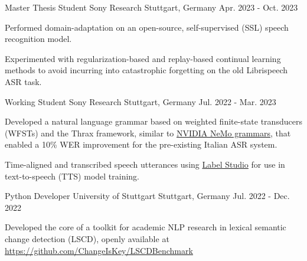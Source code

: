 

\begin{cventries}

  \cventry
    {Master Thesis Student} %
    {Sony Research} %
    {Stuttgart, Germany} %
    {Apr. 2023 - Oct. 2023} %
    {
      \begin{cvitems} %
        \item {Performed domain-adaptation on an open-source, self-supervised (SSL) speech recognition model.}
        \item {Experimented with regularization-based and replay-based continual learning methods to avoid incurring into catastrophic forgetting on the old Librispeech ASR task.}
      \end{cvitems}
    }

  \cventry
    {Working Student} %
    {Sony Research} %
    {Stuttgart, Germany} %
    {Jul. 2022 - Mar. 2023} %
    {
      \begin{cvitems} %
        \item {Developed a natural language grammar based on weighted finite-state transducers (WFSTs) and the Thrax framework, similar to \href{https://github.com/NVIDIA/NeMo-text-processing}{NVIDIA NeMo grammars}, that enabled a 10\% WER improvement for the pre-existing Italian ASR system.}
        \item {Time-aligned and transcribed speech utterances using \href{https://labelstud.io/}{Label Studio} for use in text-to-speech (TTS) model training.}
      \end{cvitems}
    }

  \cventry
    {Python Developer} %
    {University of Stuttgart} %
    {Stuttgart, Germany} %
    {Jul. 2022 - Dec. 2022} %
    {
      \begin{cvitems} %
        \item {Developed the core of a toolkit for academic NLP research in lexical semantic change detection (LSCD), openly
available at \url{https://github.com/ChangeIsKey/LSCDBenchmark}}
      \end{cvitems}
    }


\end{cventries}
